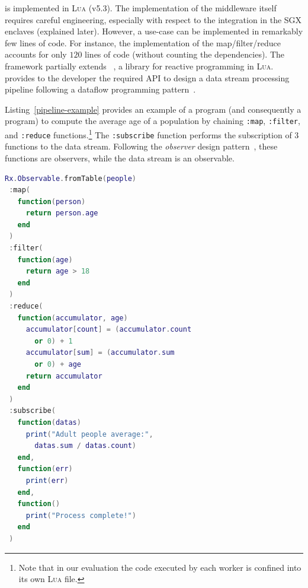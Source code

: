 \SYS{} is implemented in \textsc{Lua} (v5.3).
The implementation of the middleware itself requires careful engineering, especially with respect to the integration in the SGX enclaves (explained later).
However, a \SYS{} use-case can be implemented in remarkably few lines of code.
For instance, the implementation of the map/filter/reduce accounts for only $120$ lines of code (without counting the dependencies).
The framework partially extends \rxl~\cite{github:rxlua}, a library for reactive programming in \textsc{Lua}.
\rxl provides to the developer the required API to design a data stream processing pipeline following a dataflow programming pattern~\cite{uustalu_essence_2005}.

Listing~\ref{pipeline-example} provides an example of a \rxl program (and consequently a \SYS{} program) to compute the average age of a population by chaining \texttt{:map}, \texttt{:filter}, and \texttt{:reduce} functions.\footnote{Note that in our evaluation the code executed by each worker is confined into its own \textsc{Lua} file.}
The \texttt{:subscribe} function performs the subscription of 3 functions to the data stream.
Following the \emph{observer} design pattern~\cite{szallies_using_1997}, these functions are observers, while the data stream is an observable.

\begin{lstlisting}[language=LUA,caption={Example of process pipeline with RxLua.},label=pipeline-example]
Rx.Observable.fromTable(people)
 :map(
   function(person)
     return person.age
   end
 )
 :filter(
   function(age)
     return age > 18
   end
 )
 :reduce(
   function(accumulator, age)
     accumulator[count] = (accumulator.count
       or 0) + 1
     accumulator[sum] = (accumulator.sum
       or 0) + age
     return accumulator
   end
 )
 :subscribe(
   function(datas)
     print("Adult people average:",
       datas.sum / datas.count)
   end,
   function(err)
     print(err)
   end,
   function()
     print("Process complete!")
   end
 )
\end{lstlisting}

